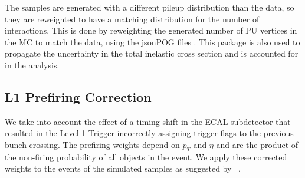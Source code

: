 The samples are generated with a different pileup distribution than the data, so they are reweighted to have a matching distribution for the number of interactions. This is done by reweighting the generated number of PU vertices in the MC to match the data, using the jsonPOG files \cite{jsonPOG}. This package is also used to propagate the uncertainty in the total inelastic cross section and is accounted for in the analysis. 


\subsection{L1 Prefiring Correction}

We take into account the effect of a timing shift in the ECAL subdetector that resulted in the Level-1 Trigger incorrectly assigning trigger flags to the previous bunch crossing. The prefiring weights depend on $p_T$ and $\eta$ and are the product of the non-firing probability of all objects in the event. We apply these corrected weights to the events of the simulated samples as suggested by ~\cite{L1prefiring}. 





